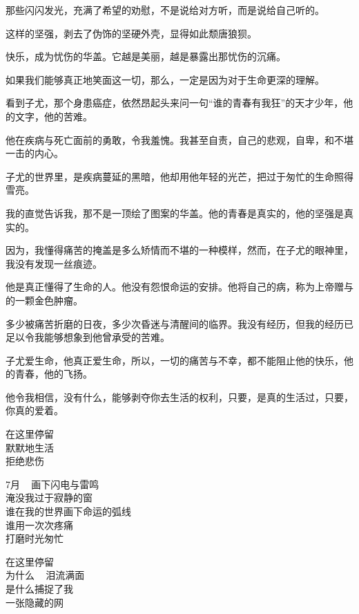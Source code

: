 		那些闪闪发光，充满了希望的劝慰，不是说给对方听，而是说给自己听的。

		这样的坚强，剥去了伪饰的坚硬外壳，显得如此颓唐狼狈。

		快乐，成为忧伤的华盖。它越是美丽，越是暴露出那忧伤的沉痛。

		如果我们能够真正地笑面这一切，那么，一定是因为对于生命更深的理解。

		看到子尤，那个身患癌症，依然昂起头来问一句“谁的青春有我狂”的天才少年，他的文字，他的苦难。

		他在疾病与死亡面前的勇敢，令我羞愧。我甚至自责，自己的悲观，自卑，和不堪一击的内心。

		子尤的世界里，是疾病蔓延的黑暗，他却用他年轻的光芒，把过于匆忙的生命照得雪亮。

		我的直觉告诉我，那不是一顶绘了图案的华盖。他的青春是真实的，他的坚强是真实的。

		因为，我懂得痛苦的掩盖是多么矫情而不堪的一种模样，然而，在子尤的眼神里，我没有发现一丝痕迹。

		他是真正懂得了生命的人。他没有怨恨命运的安排。他将自己的病，称为上帝赠与的一颗金色肿瘤。

		多少被痛苦折磨的日夜，多少次昏迷与清醒间的临界。我没有经历，但我的经历已足以令我能够想象到他曾承受的苦难。

		子尤爱生命，他真正爱生命，所以，一切的痛苦与不幸，都不能阻止他的快乐，他的青春，他的飞扬。

		他令我相信，没有什么，能够剥夺你去生活的权利，只要，是真的生活过，只要，你真的爱着。

	\endwriting


	\longpoem{}{}{}

		在这里停留 \\
		默默地生活 \\
		拒绝悲伤

		7月 ~ 画下闪电与雷鸣 \\
		淹没我过于寂静的窗 \\
		谁在我的世界画下命运的弧线 \\
		谁用一次次疼痛 \\
		打磨时光匆忙

		在这里停留 \\
		为什么 ~ 泪流满面 \\
		是什么捕捉了我 \\
		一张隐藏的网

	\endlongpoem
	\endwriting



